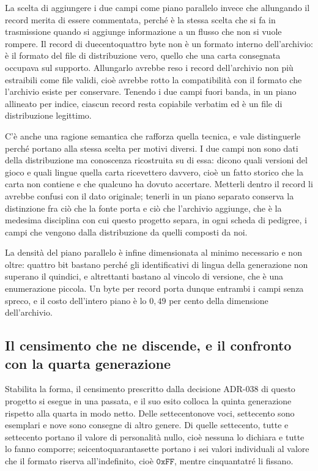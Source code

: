 La scelta di aggiungere i due campi come piano parallelo invece che allungando il record merita di essere commentata, perché è la stessa scelta che si fa in trasmissione quando si aggiunge informazione a un flusso che non si vuole rompere. Il record di duecentoquattro byte non è un formato interno dell'archivio: è il formato del file di distribuzione vero, quello che una carta consegnata occupava sul supporto. Allungarlo avrebbe reso i record dell'archivio non più estraibili come file validi, cioè avrebbe rotto la compatibilità con il formato che l'archivio esiste per conservare. Tenendo i due campi fuori banda, in un piano allineato per indice, ciascun record resta copiabile verbatim ed è un file di distribuzione legittimo.

C'è anche una ragione semantica che rafforza quella tecnica, e vale distinguerle perché portano alla stessa scelta per motivi diversi. I due campi non sono dati della distribuzione ma conoscenza ricostruita su di essa: dicono quali versioni del gioco e quali lingue quella carta ricevettero davvero, cioè un fatto storico che la carta non contiene e che qualcuno ha dovuto accertare. Metterli dentro il record li avrebbe confusi con il dato originale; tenerli in un piano separato conserva la distinzione fra ciò che la fonte porta e ciò che l'archivio aggiunge, che è la medesima disciplina con cui questo progetto separa, in ogni scheda di pedigree, i campi che vengono dalla distribuzione da quelli composti da noi.

La densità del piano parallelo è infine dimensionata al minimo necessario e non oltre: quattro bit bastano perché gli identificativi di lingua della generazione non superano il quindici, e altrettanti bastano al vincolo di versione, che è una enumerazione piccola. Un byte per record porta dunque entrambi i campi senza spreco, e il costo dell'intero piano è lo $0{,}49$ per cento della dimensione dell'archivio.

\subsection{Il censimento che ne discende, e il confronto con la quarta generazione}

Stabilita la forma, il censimento prescritto dalla decisione ADR-038 di questo progetto si esegue in una passata, e il suo esito colloca la quinta generazione rispetto alla quarta in modo netto. Delle settecentonove voci, settecento sono esemplari e nove sono consegne di altro genere. Di quelle settecento, tutte e settecento portano il valore di personalità nullo, cioè nessuna lo dichiara e tutte lo fanno comporre; seicentoquarantasette portano i sei valori individuali al valore che il formato riserva all'indefinito, cioè $\mathtt{0xFF}$, mentre cinquantatré li fissano.

